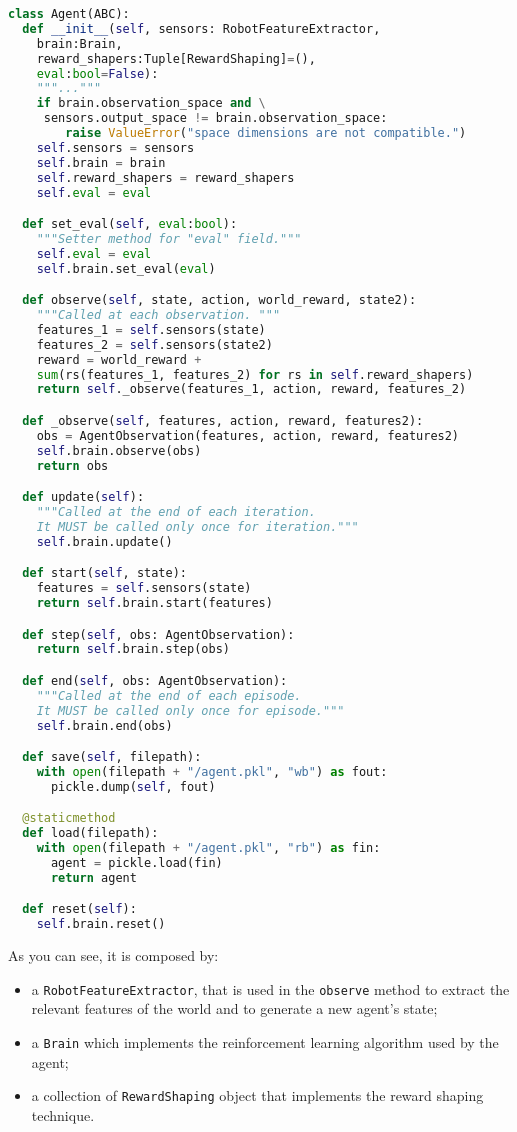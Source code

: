\begin{lstlisting}[style=Python, language=Python, escapechar=£, label={code:agent}, caption={The \texttt{Agent} abstraction.}]
class Agent(ABC):
  def __init__(self, sensors: RobotFeatureExtractor,
    brain:Brain,
    reward_shapers:Tuple[RewardShaping]=(),
    eval:bool=False):
    """..."""
    if brain.observation_space and \
     sensors.output_space != brain.observation_space:
        raise ValueError("space dimensions are not compatible.")
    self.sensors = sensors
    self.brain = brain
    self.reward_shapers = reward_shapers
    self.eval = eval

  def set_eval(self, eval:bool):
    """Setter method for "eval" field."""
    self.eval = eval
    self.brain.set_eval(eval)

  def observe(self, state, action, world_reward, state2):
    """Called at each observation. """
    features_1 = self.sensors(state)
    features_2 = self.sensors(state2)
    reward = world_reward +
    sum(rs(features_1, features_2) for rs in self.reward_shapers)
    return self._observe(features_1, action, reward, features_2)

  def _observe(self, features, action, reward, features2):
    obs = AgentObservation(features, action, reward, features2)
    self.brain.observe(obs)
    return obs

  def update(self):
    """Called at the end of each iteration.
    It MUST be called only once for iteration."""
    self.brain.update()

  def start(self, state):
    features = self.sensors(state)
    return self.brain.start(features)

  def step(self, obs: AgentObservation):
    return self.brain.step(obs)

  def end(self, obs: AgentObservation):
    """Called at the end of each episode.
    It MUST be called only once for episode."""
    self.brain.end(obs)

  def save(self, filepath):
    with open(filepath + "/agent.pkl", "wb") as fout:
      pickle.dump(self, fout)

  @staticmethod
  def load(filepath):
    with open(filepath + "/agent.pkl", "rb") as fin:
      agent = pickle.load(fin)
      return agent

  def reset(self):
    self.brain.reset()

\end{lstlisting}

As you can see, it is composed by:
\begin{itemize}
	\item a \texttt{RobotFeatureExtractor}, that is used in the \texttt{observe} method to extract the relevant features of the world and to generate a new agent's state;
	\item a \texttt{Brain} which implements the reinforcement learning algorithm used by the agent;
	\item a collection of \texttt{RewardShaping} object that implements the reward shaping technique.
\end{itemize}

